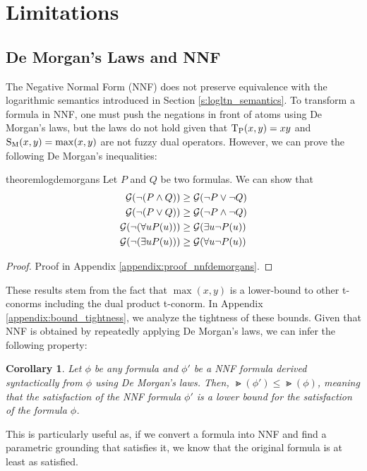\documentclass{article}
\newtheorem{corollary}{Corollary}[theorem]
\theoremstyle{definition}
\begin{document}
\section{Limitations}
\label{s:comparisons}
\subsection{De Morgan's Laws and NNF}
\label{s:NNF}
The Negative Normal Form (NNF) does not preserve equivalence with the logarithmic semantics introduced in Section \ref{s:logltn_semantics}.
To transform a formula in NNF, one must push the negations in front of atoms using De Morgan's laws, but the laws do not hold given that $\operatorname{T_{P}}(x,y)=xy$ and $\operatorname{S_{M}}(x,y) = \max(x,y)$ are not fuzzy dual operators.
However, we can prove the following De Morgan's inequalities:

\begin{restatable}{theorem}{logdemorgans}
    \label{thm:log_demorgans}
    Let $P$ and $Q$ be two formulas. We can show that
    \begin{align}
        \mathcal{G}(\lnot(P \land Q)) & \geq \mathcal{G}(\lnot P \lor \lnot Q) \\
        \mathcal{G}(\lnot(P \lor Q)) & \geq \mathcal{G}(\lnot P \land \lnot Q) \\
        \mathcal{G}(\lnot(\forall u P(u))) & \geq \mathcal{G}(\exists u \lnot P(u)) \\
        \mathcal{G}(\lnot(\exists u P(u))) & \geq \mathcal{G}(\forall u \lnot P(u))
    \end{align}
\end{restatable}
\begin{proof}
    Proof in Appendix \ref{appendix:proof_nnfdemorgans}.
\end{proof}
These results stem from the fact that $\max(x,y)$ is a lower-bound to other t-conorms including the dual product t-conorm.
In Appendix \ref{appendix:bound_tightness}, we analyze the tightness of these bounds.
Given that NNF is obtained by repeatedly applying De Morgan's laws, we can infer the following property:
\begin{corollary}
    Let $\phi$ be any formula and $\phi'$ be a NNF formula derived syntactically from $\phi$ using De Morgan's laws.
    Then, $\Gt(\phi') \leq \Gt(\phi)$, meaning that the satisfaction of the NNF formula $\phi'$ is a lower bound for the satisfaction of the formula $\phi$.
\end{corollary}
This is particularly useful as, if we convert a formula into NNF and find a parametric grounding that satisfies it, we know that the original formula is at least as satisfied.
\end{document}
